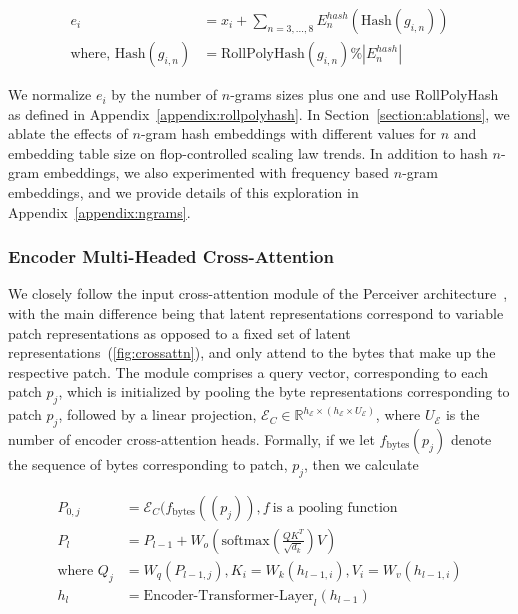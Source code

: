 \begin{align}
e_i &= x_i + \sum_{n = 3,...,8}E_{n}^{hash}(\text{Hash}(g_{i,n})) \\
\text{where, Hash}(g_{i,n}) &= \text{RollPolyHash}(g_{i,n}) \% |E_{n}^{hash}|
\end{align}

We normalize $e_i$ by the number of $n$-grams sizes plus one and use RollPolyHash as defined in Appendix~\ref{appendix:rollpolyhash}.
In Section~\ref{section:ablations}, we ablate the effects of $n$-gram hash embeddings with different values for $n$ and embedding table size on flop-controlled scaling law trends. In addition to hash $n$-gram embeddings, we also experimented with frequency based $n$-gram embeddings, and we provide details of this exploration in Appendix~\ref{appendix:ngrams}.

\subsubsection{Encoder Multi-Headed Cross-Attention}
\label{sec:enc-cross-attn}
We closely follow the input cross-attention module of the Perceiver architecture~\citep{jaegle2021perceiver}, with the main difference being that latent representations correspond to variable patch representations as opposed to a fixed set of latent representations~(\autoref{fig:crossattn}), and only attend to the bytes that make up the respective patch. The module comprises a query vector, corresponding to each patch $p_j$, which is initialized by pooling the byte representations corresponding to patch $p_j$, followed by a linear projection, $\mathcal{E}_{C} \in \mathbb{R}^{h_{\mathcal{E}} \times (h_{\mathcal{E}} \times U_{\mathcal{E}})}$, where $U_{\mathcal{E}}$ is the number of encoder cross-attention heads. Formally, if we let $f_{\text{bytes}}(p_j)$ denote the sequence of bytes corresponding to patch, $p_j$, then we calculate

\begin{align}
P_{0,j} &= \mathcal{E}_{C}(f_\text{bytes}((p_j)), f~ \text{is a pooling function} \\
P_l &= P_{l-1} + W_o\left(\text{softmax}\left(\frac{QK^T}{\sqrt{d_k}}\right)V\right) \\
\text{where } Q_j &= W_q(P_{l-1,j}), K_i = W_k(h_{l-1,i}), V_i = W_v(h_{l-1,i}) \\
h_l &= \text{Encoder-Transformer-Layer}_l(h_{l-1})
\end{align}

